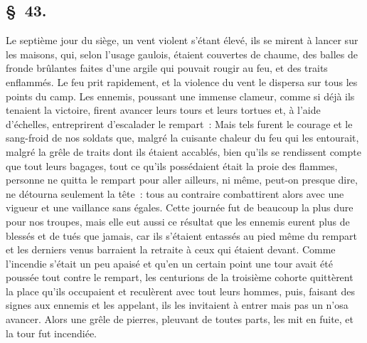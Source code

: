 \documentclass[french,twoside]{book} %
\begin{document}
\subsection[{§ 43.}]{ \textsc{§ 43.} }
\noindent Le septième jour du siège, un vent violent s’étant élevé, ils se mirent à lancer sur les maisons, qui, selon l’usage gaulois, étaient couvertes de chaume, des balles de fronde brûlantes faites d’une argile qui pouvait rougir au feu, et des traits enflammés. Le feu prit rapidement, et la violence du vent le dispersa sur tous les points du camp. Les ennemis, poussant une immense clameur, comme si déjà ils tenaient la victoire, firent avancer leurs tours et leurs tortues et, à l’aide d’échelles, entreprirent d’escalader le rempart : Mais tels furent le courage et le sang-froid de nos soldats que, malgré la cuisante chaleur du feu qui les entourait, malgré la grêle de traits dont ils étaient accablés, bien qu’ils se rendissent compte que tout leurs bagages, tout ce qu’ils possédaient était la proie des flammes, personne ne quitta le rempart pour aller ailleurs, ni même, peut-on presque dire, ne détourna seulement la tête : tous au contraire combattirent alors avec une vigueur et une vaillance sans égales. Cette journée fut de beaucoup la plus dure pour nos troupes, mais elle eut aussi ce résultat que les ennemis eurent plus de blessés et de tués que jamais, car ils s’étaient entassés au pied même du rempart et les derniers venus barraient la retraite à ceux qui étaient devant. Comme l’incendie s’était un peu apaisé et qu’en un certain point une tour avait été poussée tout contre le rempart, les centurions de la troisième cohorte quittèrent la place qu’ils occupaient et reculèrent avec tout leurs hommes, puis, faisant des signes aux ennemis et les appelant, ils les invitaient à entrer mais pas un n’osa avancer. Alors une grêle de pierres, pleuvant de toutes parts, les mit en fuite, et la tour fut incendiée.
\end{document}
